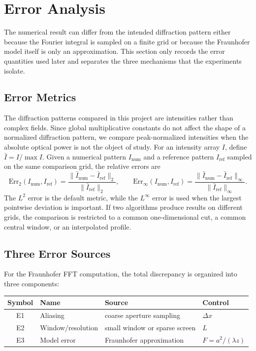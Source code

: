 \documentclass[12pt]{article}
\begin{document}
\section{Error Analysis}

The numerical result can differ from the intended diffraction pattern either because the Fourier integral is
sampled on a finite grid or because the Fraunhofer model itself is only an approximation. This section only
records the error quantities used later and separates the three mechanisms that the experiments isolate.

\subsection{Error Metrics}

The diffraction patterns compared in this project are intensities rather than complex fields. Since global
multiplicative constants do not affect the shape of a normalized diffraction pattern, we compare
peak-normalized intensities when the absolute optical power is not the object of study. For an intensity
array \(I\), define \(\bar{I}=I/\max I\). Given a numerical pattern \(I_{\mathrm{num}}\) and a reference
pattern \(I_{\mathrm{ref}}\) sampled on the same comparison grid, the relative errors are
\[
    \mathrm{Err}_2(I_{\mathrm{num}},I_{\mathrm{ref}})
    =
    \frac{\|\bar{I}_{\mathrm{num}}-\bar{I}_{\mathrm{ref}}\|_2}
    {\|\bar{I}_{\mathrm{ref}}\|_2},\qquad
    \mathrm{Err}_{\infty}(I_{\mathrm{num}},I_{\mathrm{ref}})
    =
    \frac{\|\bar{I}_{\mathrm{num}}-\bar{I}_{\mathrm{ref}}\|_{\infty}}
    {\|\bar{I}_{\mathrm{ref}}\|_{\infty}}.
\]
The \(L^2\) error is the default metric, while the \(L^\infty\) error is used when the largest pointwise
deviation is important. If two algorithms produce results on different grids, the comparison is restricted
to a common one-dimensional cut, a common central window, or an interpolated profile.

\subsection{Three Error Sources}

For the Fraunhofer FFT computation, the total discrepancy is organized into three components:

\begin{center}
\centering
\small
\begin{tabular}{c|l|l|l}
Symbol & Name & Source & Control \\
\hline
E1 & Aliasing & coarse aperture sampling & \(\Delta x\) \\
E2 & Window/resolution & small window or sparse screen & \(L\) \\
E3 & Model error & Fraunhofer approximation & \(F=a^2/(\lambda z)\)
\end{tabular}
\end{center}
\end{document}

